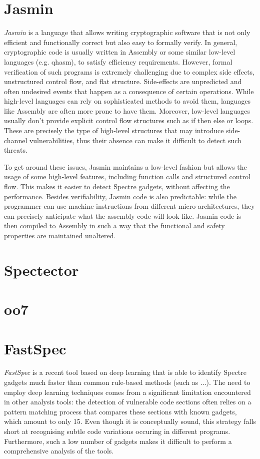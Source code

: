 \documentclass[12pt,a4paper]{book}
\theoremstyle{definition}
\begin{document}
	\section{Jasmin}
	\textit{Jasmin} \cite{Almeida2017} is a language that allows writing cryptographic software that is not only efficient and functionally correct but also easy to formally verify. In general, cryptographic code is usually written in Assembly or some similar low-level languages (e.g. \textsf{qhasm}), to satisfy efficiency requirements. However, formal verification of such programs is extremely challenging due to complex side effects, unstructured control flow, and flat structure. Side-effects are unpredicted and often undesired events that happen as a consequence of certain operations. While high-level languages can rely on sophisticated methods to avoid them, languages like Assembly are often more prone to have them. Moreover, low-level languages usually don't provide explicit control flow structures such as if then else or loops. These are precisely the type of high-level structures that may introduce side-channel vulnerabilities, thus their absence can make it difficult to detect such threats. 
	
	To get around these issues, Jasmin maintains a low-level fashion but allows the usage of some high-level features, including function calls and structured control flow. This makes it easier to detect Spectre gadgets, without affecting the performance. Besides verifiability, Jasmin code is also predictable: while the programmer can use machine instructions from different micro-architectures, they can precisely anticipate what the assembly code will look like. Jasmin code is then compiled to Assembly in such a way that the functional and safety properties are maintained unaltered. 
	
	\section{Spectector}
	
	\section{oo7}
	
	\section{FastSpec}
	\textit{FastSpec} \cite{Tol2021} is a recent tool based on deep learning that is able to identify Spectre gadgets much faster than common rule-based methods (such as ...). The need to employ deep learning techniques comes from a significant limitation encountered in other analysis tools: the detection of vulnerable code sections often relies on a pattern matching process that compares these sections with known gadgets, which amount to only 15. Even though it is conceptually sound, this strategy falls short at recognising subtle code variations occuring in different programs. Furthermore, such a low number of gadgets makes it difficult to perform a comprehensive analysis of the tools.
	
\end{document}

